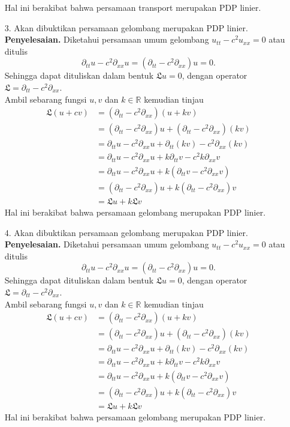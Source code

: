 \documentclass[11pt,a4paper]{article}
\newcommand{\ds}{\displaystyle}
\theoremstyle{plain}
\theoremstyle{definition}
\theoremstyle{remark}
\newcommand{\R}{\mathbb{R}}
\newcommand{\LL}{\mathfrak{L}}
\begin{document}
\begin{enumerate}
	Hal ini berakibat bahwa persamaan transport merupakan PDP linier.
	\item[3.] Akan dibuktikan persamaan gelombang merupakan PDP linier. \- \\
	\textbf{Penyelesaian.} Diketahui persamaan umum gelombang $u_{tt} - c^{2} u_{xx} = 0$ atau ditulis $$ \partial_{tt} u - c^{2} \partial_{xx}u = (\partial_{tt}-c^{2} \partial_{xx})u = 0.$$
	Sehingga dapat dituliskan dalam bentuk $\LL u=0$, dengan operator $\ds \LL = \partial_{tt}-c^{2} \partial_{xx}$.\\
	Ambil sebarang fungsi $u,v$ dan $k\in \R$ kemudian tinjau
	\begin{align*}
	\LL(u+cv) &=  (\partial_{tt}-c^{2} \partial_{xx})(u+kv) \\
	&=  (\partial_{tt}-c^{2} \partial_{xx})u +(\partial_{tt}-c^{2} \partial_{xx})(kv) \\
	&= \partial_{tt}u-c^{2} \partial_{xx}u + \partial_{tt}(kv)-c^{2} \partial_{xx}(kv) \\
	&= \partial_{tt}u-c^{2} \partial_{xx}u + k \partial_{tt}v-c^{2} k \partial_{xx}v \\
	&= \partial_{tt}u-c^{2} \partial_{xx}u + k(\partial_{tt}v - c^{2} \partial_{xx}v) \\
	&= (\partial_{tt}- c^{2} \partial_{xx}) u + k(\partial_{tt} - c^{2}  \partial_{xx}) v \\
	&= \LL u + k\LL v
	\end{align*}
	Hal ini berakibat bahwa persamaan gelombang merupakan PDP linier. 
	\item[4.] Akan dibuktikan persamaan gelombang merupakan PDP linier. \- \\
	\textbf{Penyelesaian.} Diketahui persamaan umum gelombang $u_{tt} - c^{2} u_{xx} = 0$ atau ditulis $$ \partial_{tt} u - c^{2} \partial_{xx}u = (\partial_{tt}-c^{2} \partial_{xx})u = 0.$$
	Sehingga dapat dituliskan dalam bentuk $\LL u=0$, dengan operator $\ds \LL = \partial_{tt}-c^{2} \partial_{xx}$.\\
	Ambil sebarang fungsi $u,v$ dan $k\in \R$ kemudian tinjau
	\begin{align*}
	\LL(u+cv) &=  (\partial_{tt}-c^{2} \partial_{xx})(u+kv) \\
	&=  (\partial_{tt}-c^{2} \partial_{xx})u +(\partial_{tt}-c^{2} \partial_{xx})(kv) \\
	&= \partial_{tt}u-c^{2} \partial_{xx}u + \partial_{tt}(kv)-c^{2} \partial_{xx}(kv) \\
	&= \partial_{tt}u-c^{2} \partial_{xx}u + k \partial_{tt}v-c^{2} k \partial_{xx}v \\
	&= \partial_{tt}u-c^{2} \partial_{xx}u + k(\partial_{tt}v - c^{2} \partial_{xx}v) \\
	&= (\partial_{tt}- c^{2} \partial_{xx}) u + k(\partial_{tt} - c^{2}  \partial_{xx}) v \\
	&= \LL u + k\LL v
	\end{align*}
	Hal ini berakibat bahwa persamaan gelombang merupakan PDP linier. 
\end{enumerate}
\end{document}
